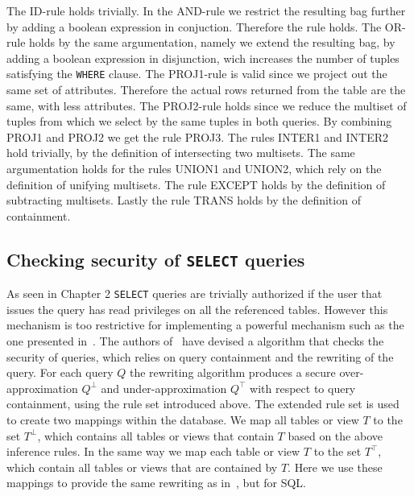 The ID-rule holds trivially.
%
In the AND-rule we restrict the resulting bag further by adding a boolean expression in conjuction. 
%
Therefore the rule holds.
%
The OR-rule holds by the same argumentation, namely we extend the resulting bag, by adding a boolean expression in disjunction, wich increases the number of tuples satisfying the \texttt{WHERE} clause.
%
The PROJ1-rule is valid since we project out the same set of attributes. Therefore the actual rows returned from the table are the same, with less attributes.
%
%
The PROJ2-rule holds since we reduce the multiset of tuples from which we select by the same tuples in both queries.
%
By combining PROJ1 and PROJ2 we get the rule PROJ3.
%
The rules INTER1 and INTER2 hold trivially, by the definition of intersecting two multisets.
%
The same argumentation holds for the rules UNION1 and UNION2, which rely on the definition of unifying multisets.
%
The rule EXCEPT holds by the definition of subtracting multisets.
%
Lastly the rule TRANS holds by the definition of containment.

\FloatBarrier
\subsection{Checking security of \texttt{SELECT} queries}

As seen in Chapter 2 \texttt{SELECT} queries are trivially authorized if the user that issues the query has read privileges on all the referenced tables.
%
However this mechanism is too restrictive for implementing a powerful mechanism such as the one presented in~\cite{guarnieri2016strong}.
%
The authors of~\cite{guarnieri2016strong} have devised a algorithm that checks the security of queries, which relies on query containment and the rewriting of the query.
%
For each query $Q$ the rewriting algorithm produces a secure over-approximation $Q^\bot$ and under-approximation $Q^\top$ with respect to query containment, using the rule set introduced above.
%
The extended rule set is used to create two mappings within the database.
%
We map all tables or view $T$ to the set $T^\bot$, which contains all tables or views that contain $T$ based on the above inference rules.
%
In the same way we map each table or view $T$ to the set $T^\top$, which contain all tables or views that are contained by $T$.
%
Here we use these mappings to provide the same rewriting as in~\cite{guarnieri2016strong}, but for SQL.


